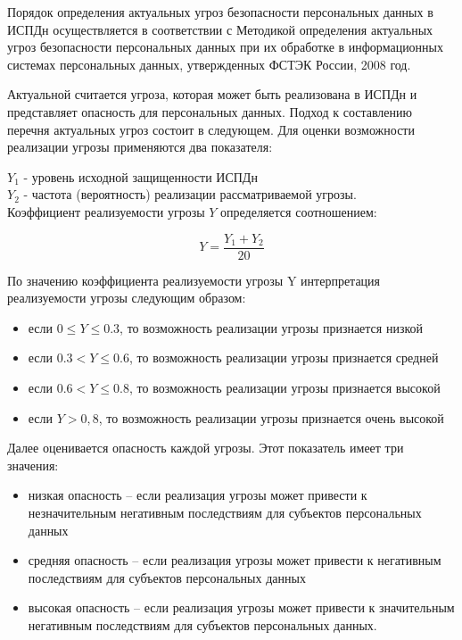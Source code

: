 Порядок определения актуальных угроз безопасности 
персональных данных в ИСПДн осуществляется 
в соответствии с Методикой определения 
актуальных угроз безопасности персональных данных 
при их обработке в информационных 
системах персональных данных, утвержденных 
ФСТЭК России, 2008 год.

Актуальной считается угроза, которая может быть 
реализована в ИСПДн и представляет опасность для 
персональных данных.  Подход к составлению перечня 
актуальных угроз состоит в следующем. 
Для оценки возможности реализации угрозы применяются два показателя: 

$Y_1$ - уровень исходной защищенности ИСПДн\\
$Y_2$ - частота (вероятность) реализации рассматриваемой угрозы.\\
Коэффициент реализуемости угрозы $Y$ определяется соотношением: 

\[Y = \frac{Y_1 + Y_2}{20}\]

По значению коэффициента реализуемости угрозы Y 
интерпретация реализуемости угрозы следующим образом: 
\begin{itemize}
    \item если $0 \leq Y \leq 0.3$, то возможность реализации угрозы признается низкой
    \item если $0.3 < Y \leq  0.6$, то возможность реализации угрозы признается средней 
    \item если $0.6 < Y \leq  0.8$, то возможность реализации угрозы признается высокой 
    \item если $Y > 0,8$, то возможность реализации угрозы признается очень высокой
\end{itemize}

Далее оценивается опасность каждой угрозы.
Этот показатель имеет три значения: 
\begin{itemize}
    \item низкая опасность – если реализация угрозы может привести к незначительным негативным последствиям для субъектов персональных данных
    \item средняя опасность – если реализация угрозы может привести к негативным последствиям для субъектов персональных данных
    \item высокая опасность – если реализация угрозы может привести к значительным негативным последствиям для субъектов персональных данных.
\end{itemize}

